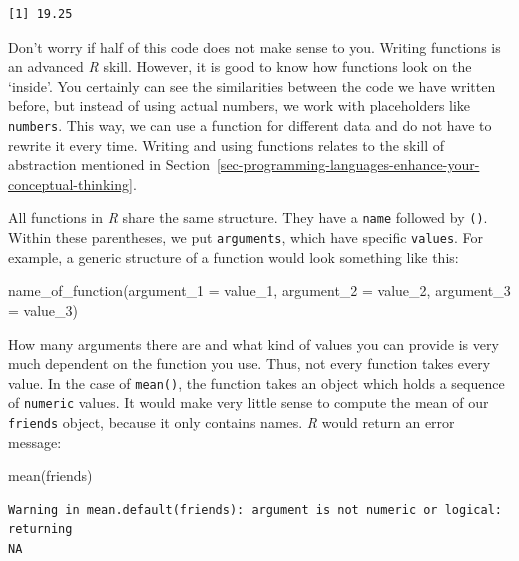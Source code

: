\documentclass[
  letterpaper,
]{krantz}
\makeatletter
\newenvironment{Shaded}{\begin{snugshade}}{\end{snugshade}}
\newcommand{\AttributeTok}[1]{\textcolor[rgb]{0.40,0.45,0.13}{#1}}
\newcommand{\FunctionTok}[1]{\textcolor[rgb]{0.28,0.35,0.67}{#1}}
\newcommand{\NormalTok}[1]{\textcolor[rgb]{0.00,0.23,0.31}{#1}}
\newenvironment{kframe}{%
\medskip{}
\setlength{\fboxsep}{.8em}
 \def\at@end@of@kframe{}%
 \ifinner\ifhmode%
  \def\at@end@of@kframe{\end{minipage}}%
  \begin{minipage}{\columnwidth}%
 \fi\fi%
 \def\FrameCommand##1{\hskip\@totalleftmargin \hskip-\fboxsep
 \colorbox{shadecolor}{##1}\hskip-\fboxsep
     \hskip-\linewidth \hskip-\@totalleftmargin \hskip\columnwidth}%
 \MakeFramed {\advance\hsize-\width
   \@totalleftmargin\z@ \linewidth\hsize
   \@setminipage}}%
 {\par\unskip\endMakeFramed%
 \at@end@of@kframe}
\renewenvironment{Shaded}{\begin{kframe}}{\end{kframe}}
\makeatother
\begin{document}
\begin{verbatim}
[1] 19.25
\end{verbatim}

Don't worry if half of this code does not make sense to you. Writing
functions is an advanced \emph{R} skill. However, it is good to know how
functions look on the `inside'. You certainly can see the similarities
between the code we have written before, but instead of using actual
numbers, we work with placeholders like \texttt{numbers}. This way, we
can use a function for different data and do not have to rewrite it
every time. Writing and using functions relates to the skill of
abstraction mentioned in
Section~\ref{sec-programming-languages-enhance-your-conceptual-thinking}.

All functions in \emph{R} share the same structure. They have a
\texttt{name} followed by \texttt{()}. Within these parentheses, we put
\texttt{arguments}, which have specific \texttt{values}. For example, a
generic structure of a function would look something like this:

\begin{Shaded}
\begin{Highlighting}[]
\FunctionTok{name\_of\_function}\NormalTok{(}\AttributeTok{argument\_1 =}\NormalTok{ value\_1,}
                 \AttributeTok{argument\_2 =}\NormalTok{ value\_2,}
                 \AttributeTok{argument\_3 =}\NormalTok{ value\_3)}
\end{Highlighting}
\end{Shaded}

How many arguments there are and what kind of values you can provide is
very much dependent on the function you use. Thus, not every function
takes every value. In the case of \texttt{mean()}, the function takes an
object which holds a sequence of \texttt{numeric} values. It would make
very little sense to compute the mean of our \texttt{friends} object,
because it only contains names. \emph{R} would return an error message:

\begin{Shaded}
\begin{Highlighting}[]
\FunctionTok{mean}\NormalTok{(friends)}
\end{Highlighting}
\end{Shaded}

\begin{verbatim}
Warning in mean.default(friends): argument is not numeric or logical: returning
NA
\end{verbatim}
\end{document}
